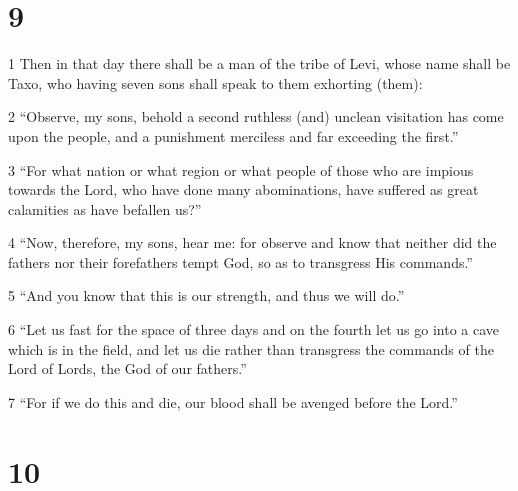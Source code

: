 \chapter{9}

\par 1 Then in that day there shall be a man of the tribe of Levi, whose name shall be Taxo, who having seven sons shall speak to them exhorting (them):
\par 2 “Observe, my sons, behold a second ruthless (and) unclean visitation has come upon the people, and a punishment merciless and far exceeding the first.”
\par 3 “For what nation or what region or what people of those who are impious towards the Lord, who have done many abominations, have suffered as great calamities as have befallen us?”
\par 4 “Now, therefore, my sons, hear me: for observe and know that neither did the fathers nor their forefathers tempt God, so as to transgress His commands.”
\par 5 “And you know that this is our strength, and thus we will do.”
\par 6 “Let us fast for the space of three days and on the fourth let us go into a cave which is in the field, and let us die rather than transgress the commands of the Lord of Lords, the God of our fathers.”
\par 7 “For if we do this and die, our blood shall be avenged before the Lord.”

\chapter{10}

